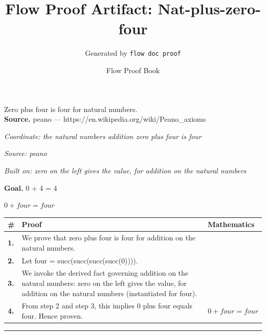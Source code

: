 \documentclass[11pt]{article}
\title{Flow Proof Artifact: Nat-plus-zero-four}
\author{Generated by \texttt{flow doc proof}}
\date{Flow Proof Book}
\theoremstyle{definition}
\begin{document}
\maketitle
Zero plus four is four for natural numbers.\\[0.5em]
\textbf{Source.} peano — https://en.wikipedia.org/wiki/Peano\_axioms\\[0.5em]
\bigskip
{}\par
\smallskip\noindent\textit{Coordinate: the natural numbers \cdot addition \cdot zero plus four is four}\par
\smallskip\noindent\textit{Source: peano}\par
\smallskip\noindent\textit{Built on: zero on the left gives the value, for addition on the natural numbers}\par
\medskip
\noindent\textbf{Goal.} 0 + 4 = 4\par
\noindent$\displaystyle 0 + four = four$\par
\medskip
\noindent
\begin{tabular}{@{} >{\raggedright\arraybackslash}p{} >{\raggedright\arraybackslash}p{} >{\raggedleft\arraybackslash}p{} @{}}
\textbf{\#} & \textbf{Proof} & \textbf{Mathematics} \\
\midrule
\textbf{1.} & We prove that zero plus four is four for addition on the natural numbers. & \\[0.45em]
\textbf{2.} & Let four = succ(succ(succ(succ(0)))). & \\[0.45em]
\textbf{3.} & We invoke the derived fact governing addition on the natural numbers: zero on the left gives the value, for addition on the natural numbers (instantiated for four). & \\[0.45em]
\textbf{4.} & From step 2 and step 3, this implies 0 plus four equals four. Hence proven. & $\displaystyle 0 + four = four$ \\[0.45em]
\bottomrule
\end{tabular}
\label{thm:Nat-addition-zero_plus_four_is_four}
\par\medskip\hrule
\end{document}
